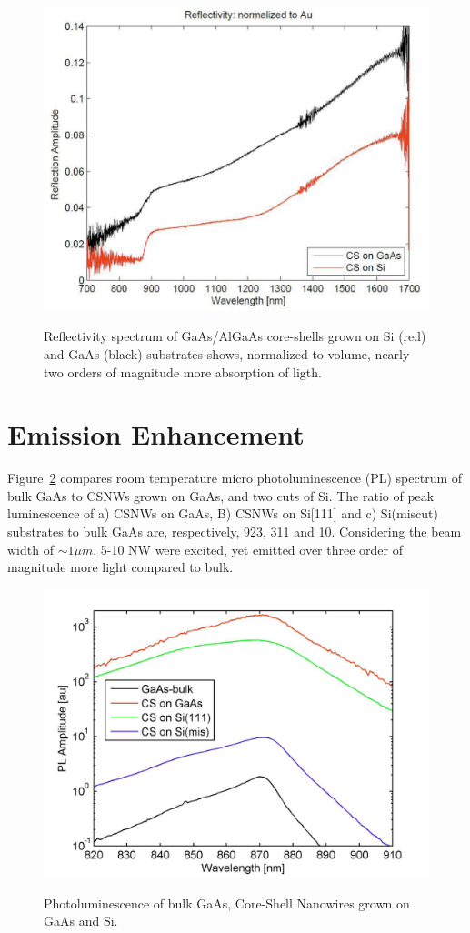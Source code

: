 \begin{figure}
  \caption{Reflectivity spectrum of GaAs/AlGaAs core-shells grown on Si (red) and GaAs (black) substrates shows, normalized to volume, nearly two orders of magnitude more absorption of ligth.}
  \centering
  \includegraphics[width=\textwidth]{pictures/Data/reflectCSNW}
  \label{reflectCSNW}
\end{figure}

\section{Emission Enhancement} \label{Dust_data}

Figure~\ref{PL} compares room temperature micro photoluminescence (PL) spectrum
of bulk GaAs to CSNWs grown on GaAs, and two cuts of Si. The ratio of peak
luminescence of a) CSNWs on GaAs, B) CSNWs on Si[111] and c) Si(miscut)
substrates to bulk GaAs are, respectively, 923, 311 and 10. Considering the
beam width of $\sim1{\mu}m$, 5-10 NW were excited, yet emitted over three
order of magnitude more light compared to bulk.

\begin{figure}
  \caption{Photoluminescence of bulk GaAs, Core-Shell Nanowires grown on GaAs and Si.}
  \centering
  \includegraphics[width=\textwidth]{pictures/Data/PL}
  \label{PL}
\end{figure}

